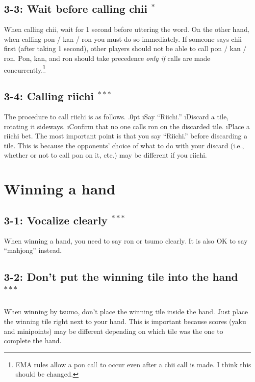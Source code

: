 \subsection*{3-3: Wait before calling {\jap chii} $^{*}$}
When calling {\jap chii}, wait for 1 second before uttering the word. On the other hand, when calling {\jap pon} / {\jap kan} / {\jap ron} you must do so immediately. If someone says {\jap chii} first (after taking 1 second), other players should not be able to call {\jap pon} / {\jap kan} / {\jap ron}. {\jap Pon}, {\jap kan}, and {\jap ron} should take precedence \emph{only if} calls are made concurrently.\footnote{EMA rules allow a {\jap pon} call to occur even after a {\jap chii} call is made. I think this should be changed.}

\subsection*{3-4: Calling riichi $^{***}$}
The procedure to call riichi is as follows.
\be\itemsep.0pt
\i Say ``{\jap Riichi}.''
\i Discard a tile, rotating it sideways.
\i Confirm that no one calls {\jap ron} on the discarded tile.
\i Place a riichi bet.
\ee
The most important point is that you say ``{\jap Riichi}.'' before discarding a tile. This is because the opponents' choice of what to do with your discard (i.e., whether or not to call {\jap pon} on it, etc.) may be different if you riichi.

\section{Winning a hand}

\subsection*{3-1: Vocalize clearly $^{***}$}
When winning a hand, you need to say {\jap ron} or {\jap tsumo} clearly. It is also OK to say ``mahjong'' instead.

\subsection*{3-2: Don't put the winning tile into the hand $^{***}$}
When winning by {\jap tsumo}, don't place the winning tile inside the hand. Just place the winning tile right next to your hand. This is important because scores ({\jap yaku} and minipoints) may be different depending on which tile was the one to complete the hand.

